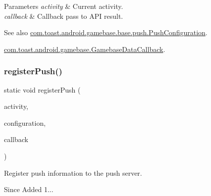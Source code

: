 \begin{DoxyParams}{Parameters}
{\em activity} & Current activity. \\
\hline
{\em callback} & Callback pass to A\+PI result. \\
\hline
\end{DoxyParams}
\begin{DoxySeeAlso}{See also}
\hyperlink{classcom_1_1toast_1_1android_1_1gamebase_1_1base_1_1push_1_1_push_configuration}{com.\+toast.\+android.\+gamebase.\+base.\+push.\+Push\+Configuration}. 

\hyperlink{interfacecom_1_1toast_1_1android_1_1gamebase_1_1_gamebase_data_callback}{com.\+toast.\+android.\+gamebase.\+Gamebase\+Data\+Callback}. 
\end{DoxySeeAlso}
\mbox{\label{classcom_1_1toast_1_1android_1_1gamebase_1_1_gamebase_1_1_push_ad8a4f6af1686327bf9af016b38988dff}} 
\subsubsection{\texorpdfstring{register\+Push()}{registerPush()}}
{\footnotesize\ttfamily static void register\+Push (\begin{DoxyParamCaption}\item[{@Non\+Null final Activity}]{activity,  }\item[{@Non\+Null final \hyperlink{classcom_1_1toast_1_1android_1_1gamebase_1_1base_1_1push_1_1_push_configuration}{Push\+Configuration}}]{configuration,  }\item[{@Non\+Null final \hyperlink{interfacecom_1_1toast_1_1android_1_1gamebase_1_1_gamebase_callback}{Gamebase\+Callback}}]{callback }\end{DoxyParamCaption})\hspace{0.3cm}{\ttfamily [static]}}



Register push information to the push server. 

\begin{DoxySince}{Since}
Added 1... 
\end{DoxySince}

